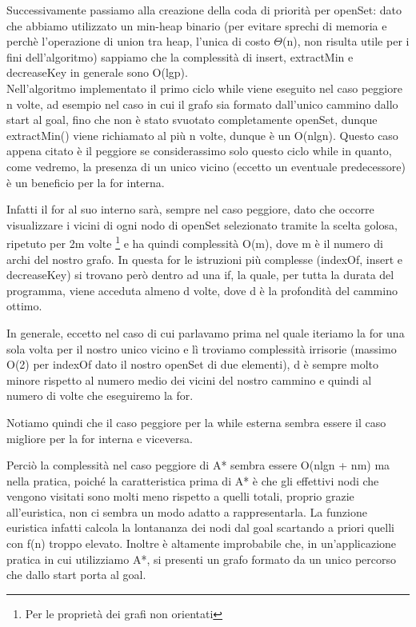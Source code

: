 \documentclass[12pt,a4paper]{report}
\begin{document}
Successivamente passiamo alla creazione della coda di priorità per openSet: dato che abbiamo utilizzato un min-heap binario (per evitare sprechi di memoria e perchè l'operazione di union tra heap, l'unica di costo \(\Theta\)(n), non risulta utile per i fini dell'algoritmo) sappiamo che la complessità di insert, extractMin e decreaseKey in generale sono O(lgp).
\\

Nell'algoritmo implementato il primo ciclo while viene eseguito nel caso peggiore n volte, ad esempio nel caso in cui il grafo sia formato dall'unico cammino dallo start al goal, fino che non è stato svuotato completamente openSet, dunque extractMin() viene richiamato al più n volte, dunque è un O(nlgn).
Questo caso appena citato è il peggiore se considerassimo solo questo ciclo while in quanto, come vedremo, la presenza di un unico vicino (eccetto un eventuale predecessore) è un beneficio per la for interna.

Infatti il for al suo interno sarà, sempre nel caso peggiore, dato che occorre visualizzare i vicini di ogni nodo di openSet selezionato tramite la scelta golosa, ripetuto per 2m volte \footnote[2]{Per le proprietà dei grafi non orientati} e ha quindi complessità O(m), dove m è il numero di archi del nostro grafo.
In questa for le istruzioni più complesse (indexOf, insert e decreaseKey) si trovano però dentro ad una if, la quale, per tutta la durata del programma, viene acceduta almeno d volte, dove d è la profondità del cammino ottimo.


In generale, eccetto nel caso di cui parlavamo prima nel quale iteriamo la for una sola volta per il nostro unico vicino e lì troviamo complessità irrisorie (massimo O(2) per indexOf dato il nostro openSet di due elementi), d è sempre molto minore rispetto al numero medio dei vicini del nostro cammino e quindi al numero di volte che eseguiremo la for.

Notiamo quindi che il caso peggiore per la while esterna sembra essere il caso migliore per la for interna e viceversa.


Perciò la complessità nel caso peggiore di A* sembra essere O(nlgn + nm) ma nella pratica, poiché la caratteristica prima di A* è che gli effettivi nodi che vengono visitati sono molti meno rispetto a quelli totali, proprio grazie all'euristica, non ci sembra un modo adatto a rappresentarla.
La funzione euristica infatti calcola la lontananza dei nodi dal goal scartando a priori quelli con f(n) troppo elevato.
Inoltre è altamente improbabile che, in un'applicazione pratica in cui utilizziamo A*, si presenti un grafo formato da un unico percorso che dallo start porta al goal.
\end{document}
